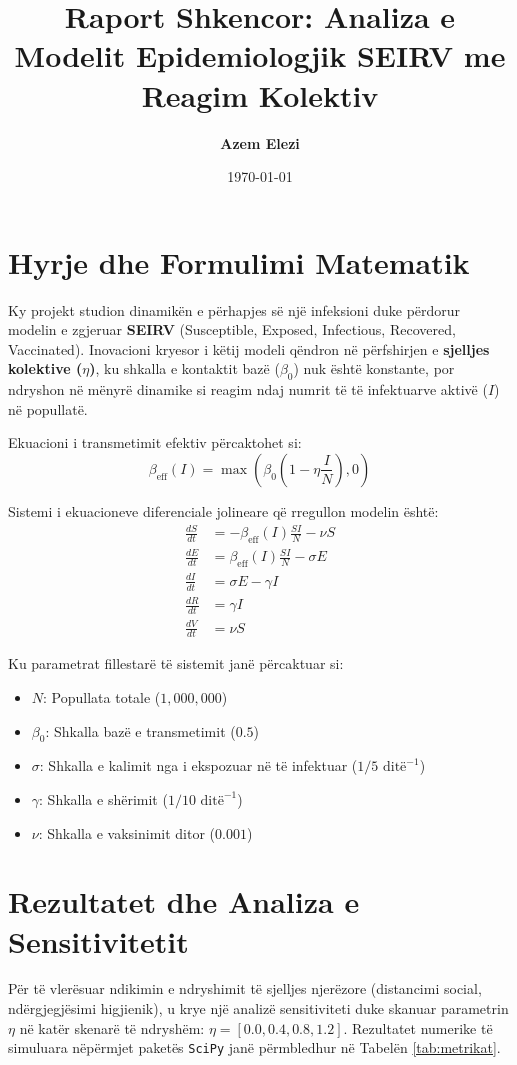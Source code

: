 \documentclass[12pt, a4paper]{article}
\title{\textbf{Raport Shkencor: Analiza e Modelit Epidemiologjik SEIRV me Reagim Kolektiv}}
\author{\textbf{Azem Elezi}}
\date{\today}
\begin{document}
\maketitle

\section{Hyrje dhe Formulimi Matematik}
Ky projekt studion dinamikën e përhapjes së një infeksioni duke përdorur modelin e zgjeruar \textbf{SEIRV} (Susceptible, Exposed, Infectious, Recovered, Vaccinated). Inovacioni kryesor i këtij modeli qëndron në përfshirjen e \textbf{sjelljes kolektive ($\eta$)}, ku shkalla e kontaktit bazë ($\beta_0$) nuk është konstante, por ndryshon në mënyrë dinamike si reagim ndaj numrit të të infektuarve aktivë ($I$) në popullatë.

Ekuacioni i transmetimit efektiv përcaktohet si:
\begin{equation}
\beta_{\text{eff}}(I) = \max\left(\beta_0 \left(1 - \eta \frac{I}{N}\right), 0\right)
\end{equation}

Sistemi i ekuacioneve diferenciale jolineare që rregullon modelin është:
\begin{align}
\frac{dS}{dt} &= -\beta_{\text{eff}}(I) \frac{S I}{N} - \nu S \\
\frac{dE}{dt} &= \beta_{\text{eff}}(I) \frac{S I}{N} - \sigma E \\
\frac{dI}{dt} &= \sigma E - \gamma I \\
\frac{dR}{dt} &= \gamma I \\
\frac{dV}{dt} &= \nu S
\end{align}

Ku parametrat fillestarë të sistemit janë përcaktuar si:
\begin{itemize}
    \item $N$: Popullata totale ($1,000,000$)
    \item $\beta_0$: Shkalla bazë e transmetimit ($0.5$)
    \item $\sigma$: Shkalla e kalimit nga i ekspozuar në të infektuar ($1/5 \text{ ditë}^{-1}$)
    \item $\gamma$: Shkalla e shërimit ($1/10 \text{ ditë}^{-1}$)
    \item $\nu$: Shkalla e vaksinimit ditor ($0.001$)
\end{itemize}

\section{Rezultatet dhe Analiza e Sensitivitetit}
Për të vlerësuar ndikimin e ndryshimit të sjelljes njerëzore (distancimi social, ndërgjegjësimi higjienik), u krye një analizë sensitiviteti duke skanuar parametrin $\eta$ në katër skenarë të ndryshëm: $\eta = [0.0, 0.4, 0.8, 1.2]$. Rezultatet numerike të simuluara nëpërmjet paketës \texttt{SciPy} janë përmbledhur në Tabelën \ref{tab:metrikat}.
\end{document}
